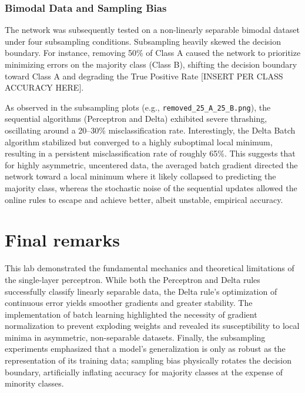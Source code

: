 \documentclass[11pt,a4paper]{article}
\begin{document}
\subsubsection{Bimodal Data and Sampling Bias}
The network was subsequently tested on a non-linearly separable bimodal dataset under four subsampling conditions. Subsampling heavily skewed the decision boundary. For instance, removing 50\% of Class A caused the network to prioritize minimizing errors on the majority class (Class B), shifting the decision boundary toward Class A and degrading the True Positive Rate [INSERT PER CLASS ACCURACY HERE].

As observed in the subsampling plots (e.g., \texttt{removed\_25\_A\_25\_B.png}), the sequential algorithms (Perceptron and Delta) exhibited severe thrashing, oscillating around a 20--30\% misclassification rate. Interestingly, the Delta Batch algorithm stabilized but converged to a highly suboptimal local minimum, resulting in a persistent misclassification rate of roughly 65\%. This suggests that for highly asymmetric, uncentered data, the averaged batch gradient directed the network toward a local minimum where it likely collapsed to predicting the majority class, whereas the stochastic noise of the sequential updates allowed the online rules to escape and achieve better, albeit unstable, empirical accuracy.

\section{Final remarks}
This lab demonstrated the fundamental mechanics and theoretical limitations of the single-layer perceptron. While both the Perceptron and Delta rules successfully classify linearly separable data, the Delta rule's optimization of continuous error yields smoother gradients and greater stability. The implementation of batch learning highlighted the necessity of gradient normalization to prevent exploding weights and revealed its susceptibility to local minima in asymmetric, non-separable datasets. Finally, the subsampling experiments emphasized that a model's generalization is only as robust as the representation of its training data; sampling bias physically rotates the decision boundary, artificially inflating accuracy for majority classes at the expense of minority classes.
\end{document}
